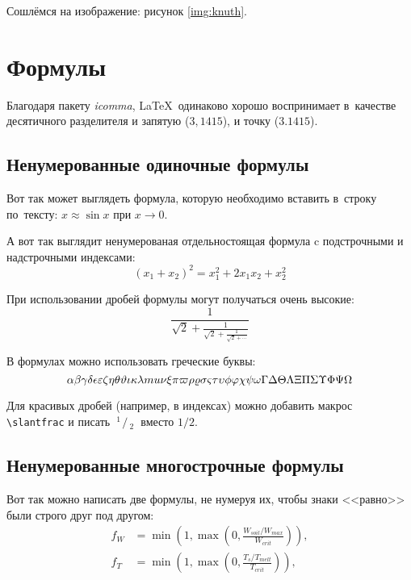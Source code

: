Сошлёмся на изображение: рисунок \ref{img:knuth}.

\section{Формулы} \label{sect1_3}

Благодаря пакету \textit{icomma}, \LaTeX~одинаково хорошо воспринимает
в~качестве десятичного разделителя и запятую ($3,1415$), и точку ($3.1415$).

\subsection{Ненумерованные одиночные формулы} \label{subsect1_3_1}

Вот так может выглядеть формула, которую необходимо вставить в~строку
по~тексту: $x \approx \sin x$ при $x \to 0$.

А вот так выглядит ненумерованая отдельностоящая формула c подстрочными
и надстрочными индексами:
\[
(x_1+x_2)^2 = x_1^2 + 2 x_1 x_2 + x_2^2
\]

При использовании дробей формулы могут получаться очень высокие:
\[
  \frac{1}{\sqrt{2}+
  \displaystyle\frac{1}{\sqrt{2}+
  \displaystyle\frac{1}{\sqrt{2}+\cdots}}}
\]

В формулах можно использовать греческие буквы:
\[
\alpha\beta\gamma\delta\epsilon\varepsilon\zeta\eta\theta\vartheta\iota\kappa%
\lambda\\mu\nu\xi\pi\varpi\rho\varrho\sigma\varsigma\tau\upsilon\phi\varphi%
\chi\psi\omega\Gamma\Delta\Theta\Lambda\Xi\Pi\Sigma\Upsilon\Phi\Psi\Omega
\]

\def\slantfrac#1#2{ \hspace{3pt}\!^{#1}\!\!\hspace{1pt}/
  \hspace{2pt}\!\!_{#2}\!\hspace{3pt}
} %
Для красивых дробей (например, в индексах) можно добавить макрос
\verb+\slantfrac+ и писать $\slantfrac{1}{2}$ вместо $1/2$.

\subsection{Ненумерованные многострочные формулы} \label{subsect1_3_2}

Вот так можно написать две формулы, не нумеруя их, чтобы знаки <<равно>> были
строго друг под другом:
\begin{align}
  f_W & =  \min \left( 1, \max \left( 0, \frac{W_{soil} / W_{max}}{W_{crit}} \right)  \right), \nonumber \\
  f_T & =  \min \left( 1, \max \left( 0, \frac{T_s / T_{melt}}{T_{crit}} \right)  \right), \nonumber
\end{align}

